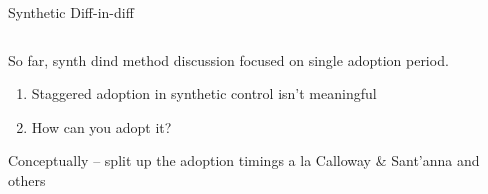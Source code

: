\documentclass[notes,11pt, aspectratio=169]{beamer}
\newenvironment{wideitemize}{\itemize\addtolength{\itemsep}{10pt}}{\enditemize}
\begin{document}
\begin{frame}{Synthetic Diff-in-diff}
  \begin{columns}[T] %
    \begin{column}{0.5\textwidth}
  \begin{wideitemize}
  \item So far, synth dind method discussion focused on single adoption period. 
    \begin{enumerate}
    \item Staggered adoption in synthetic control isn't meaningful
    \item How can you adopt it?
    \end{enumerate}
  \item Conceptually -- split up the adoption timings a la Calloway \& Sant'anna and others
  \end{wideitemize}
\end{column}
\begin{column}{0.5\textwidth}
\end{column}
\end{columns}
\end{frame}
\end{document}
